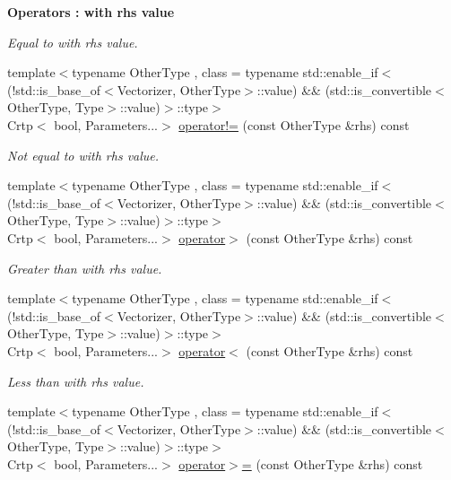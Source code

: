 \begin{Indent}{\bf Operators \-: with rhs value}
\begin{DoxyCompactItemize}
\begin{DoxyCompactList}\small\item\em Equal to with rhs value. \end{DoxyCompactList}\item 
{\footnotesize template$<$typename Other\-Type , class  = typename std\-::enable\-\_\-if$<$(!std\-::is\-\_\-base\-\_\-of$<$\-Vectorizer, Other\-Type$>$\-::value) \&\& (std\-::is\-\_\-convertible$<$\-Other\-Type, Type$>$\-::value)$>$\-::type$>$ }\\Crtp$<$ bool, Parameters...$>$ \hyperlink{classmagrathea_1_1StaticVectorizer_a745d2383572c87adb83d08e23692aa81}{operator!=} (const Other\-Type \&rhs) const 
\begin{DoxyCompactList}\small\item\em Not equal to with rhs value. \end{DoxyCompactList}\item 
{\footnotesize template$<$typename Other\-Type , class  = typename std\-::enable\-\_\-if$<$(!std\-::is\-\_\-base\-\_\-of$<$\-Vectorizer, Other\-Type$>$\-::value) \&\& (std\-::is\-\_\-convertible$<$\-Other\-Type, Type$>$\-::value)$>$\-::type$>$ }\\Crtp$<$ bool, Parameters...$>$ \hyperlink{classmagrathea_1_1StaticVectorizer_a45845efb29eba8ac0742080cb0ca161e}{operator$>$} (const Other\-Type \&rhs) const 
\begin{DoxyCompactList}\small\item\em Greater than with rhs value. \end{DoxyCompactList}\item 
{\footnotesize template$<$typename Other\-Type , class  = typename std\-::enable\-\_\-if$<$(!std\-::is\-\_\-base\-\_\-of$<$\-Vectorizer, Other\-Type$>$\-::value) \&\& (std\-::is\-\_\-convertible$<$\-Other\-Type, Type$>$\-::value)$>$\-::type$>$ }\\Crtp$<$ bool, Parameters...$>$ \hyperlink{classmagrathea_1_1StaticVectorizer_ae8fc4ac75f3f4c8c9de4083cd07cacb0}{operator$<$} (const Other\-Type \&rhs) const 
\begin{DoxyCompactList}\small\item\em Less than with rhs value. \end{DoxyCompactList}\item 
{\footnotesize template$<$typename Other\-Type , class  = typename std\-::enable\-\_\-if$<$(!std\-::is\-\_\-base\-\_\-of$<$\-Vectorizer, Other\-Type$>$\-::value) \&\& (std\-::is\-\_\-convertible$<$\-Other\-Type, Type$>$\-::value)$>$\-::type$>$ }\\Crtp$<$ bool, Parameters...$>$ \hyperlink{classmagrathea_1_1StaticVectorizer_a8e18e9b3d7412d5d824eb7c03e01ab62}{operator$>$=} (const Other\-Type \&rhs) const 

\end{DoxyCompactItemize}
\end{Indent}
